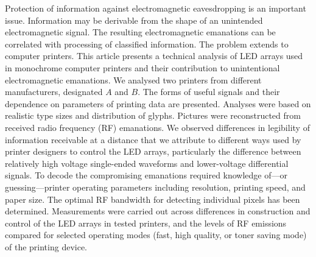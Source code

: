 Protection of information against electromagnetic eavesdropping is an
important issue. Information may be derivable from the shape of an unintended
electromagnetic signal. The resulting electromagnetic emanations can be
correlated with processing of classified information. The problem extends to
computer printers. This article presents a technical analysis of LED arrays
used in monochrome computer printers and their contribution to unintentional
electromagnetic emanations. We analysed two printers from different
manufacturers, designated $A$ and $B$. The forms of useful signals and their
dependence on parameters of printing data are presented. Analyses were based
on realistic type sizes and distribution of glyphs. Pictures were
reconstructed from received radio frequency (RF) emanations. We observed
differences in
legibility of information receivable at a distance that we attribute to
different ways used by printer designers to control the LED arrays,
particularly the difference between relatively high voltage single-ended
waveforms and lower-voltage differential signals. To decode the compromising
emanations required knowledge of---or guessing---printer operating parameters
including resolution, printing speed, and paper size. The optimal RF bandwidth
for detecting individual pixels has been determined. Measurements were
carried out across differences in construction and control of the LED arrays
in tested printers, and the levels of RF emissions compared for selected
operating modes (fast, high quality, or toner saving mode) of the printing
device.
